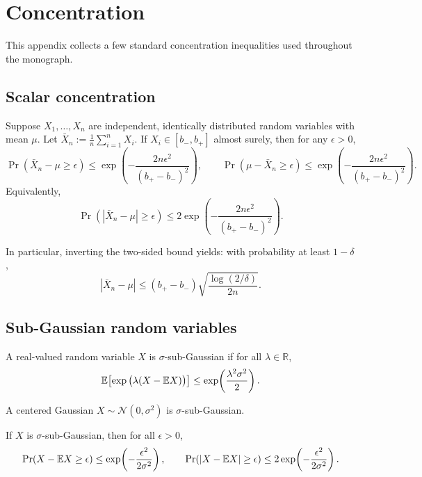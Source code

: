 \chapter{Concentration}
\label{chap:concentration}

This appendix collects a few standard concentration inequalities used throughout
the monograph.

\section{Scalar concentration}

\begin{lemma}\label{lem:hoeffding}
Suppose $X_1,\dots,X_n$ are independent, identically distributed random variables
with mean $\mu$. Let $\bar X_n := \frac{1}{n}\sum_{i=1}^n X_i$.
If $X_i\in[b_-,b_+]$ almost surely, then for any $\epsilon>0$,
\[
\Pr\!\left(\bar X_n - \mu \ge \epsilon\right)
\le
\exp\!\left(-\frac{2n\epsilon^2}{(b_+-b_-)^2}\right),
\qquad
\Pr\!\left(\mu-\bar X_n \ge \epsilon\right)
\le
\exp\!\left(-\frac{2n\epsilon^2}{(b_+-b_-)^2}\right).
\]
Equivalently,
\[
\Pr\!\left(|\bar X_n-\mu|\ge \epsilon\right)
\le 2\exp\!\left(-\frac{2n\epsilon^2}{(b_+-b_-)^2}\right).
\]
\end{lemma}

In particular, inverting the two-sided bound yields: with probability at least
$1-\delta$,
\[
|\bar X_n-\mu|
\le
(b_+-b_-)\sqrt{\frac{\log(2/\delta)}{2n}}.
\]

\section{Sub-Gaussian random variables}

\begin{definition}\label{def:sub-gauss}
A real-valued random variable $X$ is $\sigma$-sub-Gaussian if for all
$\lambda\in\mathbb{R}$,
\[
\mathbb{E}\!\left[\exp\big(\lambda(X-\mathbb{E} X)\big)\right]
\le
\exp\!\left(\frac{\lambda^2\sigma^2}{2}\right).
\]
\end{definition}

A centered Gaussian $X\sim \mathcal{N}(0,\sigma^2)$ is $\sigma$-sub-Gaussian.

\begin{theorem}\label{them:sub_gaussian_property_1}
If $X$ is $\sigma$-sub-Gaussian, then for all $\epsilon>0$,
\[
\Pr\!\left(X-\mathbb{E} X \ge \epsilon\right)
\le
\exp\!\left(-\frac{\epsilon^2}{2\sigma^2}\right),
\qquad
\Pr\!\left(|X-\mathbb{E} X|\ge \epsilon\right)
\le
2\exp\!\left(-\frac{\epsilon^2}{2\sigma^2}\right).
\]
\end{theorem}

